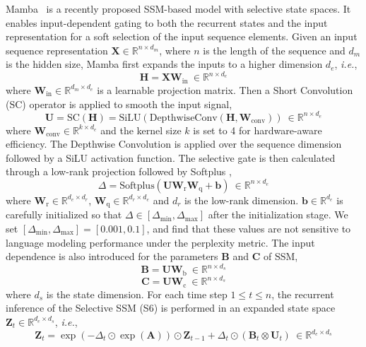 \documentclass{article}
\begin{document}
Mamba~\citep{gu2023mamba} is a recently proposed SSM-based model with selective state spaces. It enables input-dependent gating to both the recurrent states and the input representation for a soft selection of the input sequence elements. Given an input sequence representation $\mathbf{X}\in \mathbb{R}^{n\times d_m}$, where $n$ is the length of the sequence and $d_m$ is the hidden size, Mamba first expands the inputs to a higher dimension $d_e$, \emph{i.e.},
\[
\mathbf{H} = \mathbf{X} \mathbf{W}_{\text{in}}  ~\in \mathbb{R}^{n\times d_e}
\]
where $\mathbf{W}_{\text{in}} \in \mathbb{R}^{d_m\times d_e}$ is a learnable projection matrix. Then a Short Convolution (SC) \citep{poli2023hyena} operator is applied to smooth the input signal,
\begin{equation}\label{sc}
   \mathbf{U} = \text{SC}(\mathbf{H}) = \text{SiLU}(\text{DepthwiseConv}(\mathbf{H}, \mathbf{W}_\text{conv})) ~\in \mathbb{R}^{n\times d_e} 
\end{equation} 
where $ \mathbf{W}_\text{conv} \in \mathbb{R}^{k \times d_e}$ and the kernel size $k$ is set to 4 for hardware-aware efficiency. The Depthwise Convolution \citep{he2019depthwise} is applied over the sequence dimension followed by a SiLU \citep{silu} activation function. The selective gate is then calculated through a low-rank projection followed by Softplus \citep{softplus},
\begin{equation}\label{sp}
\Delta = \text{Softplus}(\mathbf{U} \mathbf{W}_\text{r} \mathbf{W}_\text{q} + \mathbf{b}) ~\in \mathbb{R}^{n \times d_e}
\end{equation} 
where $ \mathbf{W}_\text{r} \in \mathbb{R}^{d_e\times d_r} $,  $ \mathbf{W}_\text{q} \in \mathbb{R}^{d_r\times d_e} $ and $d_r$ is the low-rank dimension. $\mathbf{b} \in \mathbb{R}^{d_e}$ is carefully initialized so that $\Delta \in [\Delta_\text{min}, \Delta_\text{max}] $ after the initialization stage. We set $[\Delta_\text{min}, \Delta_\text{max}] = [0.001,0.1] $, and find that these values are not sensitive to language modeling performance under the perplexity metric. The input dependence is also introduced for the parameters $\mathbf{B}$ and $\mathbf{C}$ of SSM,
\[
\mathbf{B} = \mathbf{U} \mathbf{W}_\text{b} ~\in \mathbb{R}^{n \times d_s}
\]
\[
\mathbf{C} = \mathbf{U} \mathbf{W}_\text{c} ~\in \mathbb{R}^{n \times d_s}
\]
where $d_s$ is the state dimension. For each time step $1 \leq t \leq n$, the recurrent inference of the Selective SSM (S6) is performed in an expanded state space $\mathbf{Z}_t \in \mathbb{R}^{ d_e \times d_s} $, \emph{i.e.},
\[
\mathbf{Z}_t = \exp(- \Delta_t \odot \exp(\mathbf{A})) \odot \mathbf{Z}_{t-1} + \Delta_t \odot (\mathbf{B}_t \otimes \mathbf{U}_t) ~\in \mathbb{R}^{d_e \times d_s}
\]
\end{document}
